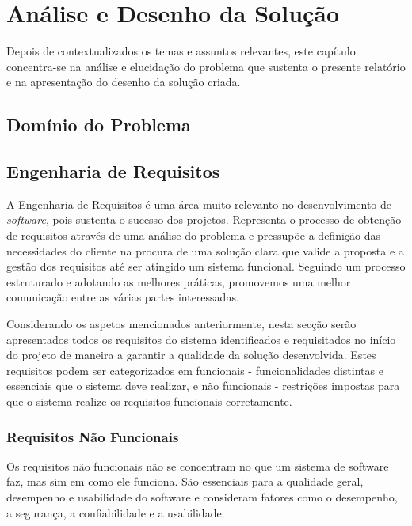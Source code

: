 \chapter{Análise e Desenho da Solução}
\label{sec:3-Analise}

Depois de contextualizados os temas e assuntos relevantes, este capítulo concentra-se na análise 
e elucidação do problema que sustenta o presente relatório e na apresentação do desenho da 
solução criada.

\section{Domínio do Problema}


\section{Engenharia de Requisitos}

A Engenharia de Requisitos é uma área muito relevanto no desenvolvimento de \textit{software}, pois 
sustenta o sucesso dos projetos. Representa o processo de obtenção de requisitos através de uma análise 
do problema e pressupõe a definição das necessidades do cliente na procura de uma solução clara 
que valide a proposta e a gestão dos requisitos até ser atingido um sistema funcional. Seguindo um 
processo estruturado e adotando as melhores práticas, promovemos uma melhor comunicação entre as 
várias partes interessadas.

Considerando os aspetos mencionados anteriormente, nesta secção serão apresentados todos os 
requisitos do sistema identificados e requisitados no início do projeto de maneira a garantir a 
qualidade da solução desenvolvida. Estes requisitos podem ser categorizados em funcionais - 
funcionalidades distintas e essenciais que o sistema deve realizar, e não funcionais - 
restrições impostas para que o sistema realize os requisitos funcionais corretamente.

\subsection{Requisitos Não Funcionais}

Os requisitos não funcionais não se concentram no que um sistema de software faz, mas sim em como 
ele funciona. São essenciais para a qualidade geral, desempenho e usabilidade do software e 
consideram fatores como o desempenho, a segurança, a confiabilidade e a usabilidade.

